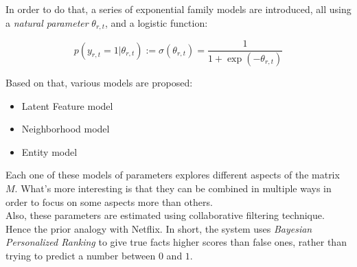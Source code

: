 \documentclass[11pt,a4paper]{article}
\begin{document}
In order to do that, a series of exponential family models are introduced, all using a \textit{natural parameter} $\theta_{r,t}$, and a logistic function:

\[p(y_{r,t}=1 \vert \theta_{r,t}) := \sigma(\theta_{r,t}) = \frac{1}{1+\exp(-\theta_{r,t})}\]

Based on that, various models are proposed:
\begin{itemize}
\item Latent Feature model
\item Neighborhood model
\item Entity model
\end{itemize}

Each one of these models of parameters explores different aspects of the matrix $M$. What's more interesting is that they can be combined in multiple ways in order to focus on some aspects more than others.\\

Also, these parameters are estimated using collaborative filtering technique. Hence the prior analogy with Netflix. In short, the system uses \textit{Bayesian Personalized Ranking} to give true facts higher scores than false ones, rather than  trying to predict a number between $0$ and $1$.
\end{document}

